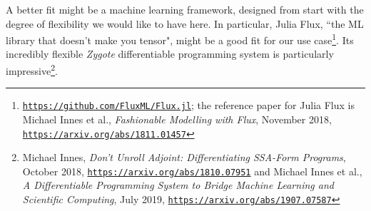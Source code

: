 \documentclass{article}
\begin{document}
A better fit might be a machine learning framework, designed from start with the degree of flexibility
we would like to have here. In particular, Julia Flux, ``the ML library that doesn't make you tensor", might be a good fit
for our use case\footnote{\href{https://github.com/FluxML/Flux.jl}{\tt https://github.com/FluxML/Flux.jl};
the reference paper for Julia Flux is Michael Innes et al., {\em Fashionable Modelling with Flux}, November 2018,
\href{https://arxiv.org/abs/1811.01457}{\tt https://arxiv.org/abs/1811.01457}}. Its incredibly flexible {\em Zygote}
differentiable programming system is particularly impressive\footnote{Michael Innes,
{\em Don't Unroll Adjoint: Differentiating SSA-Form Programs}, October 2018,
\href{https://arxiv.org/abs/1810.07951}{\tt https://arxiv.org/abs/1810.07951} and 
Michael Innes et al., {\em A Differentiable Programming System to Bridge Machine Learning and Scientific Computing}, 
July 2019, \href{https://arxiv.org/abs/1907.07587}{\tt https://arxiv.org/abs/1907.07587}}.
\end{document}
